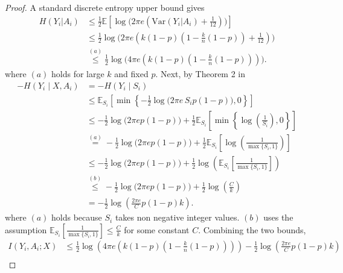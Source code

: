 \documentclass{article}
\newcommand{\E}{\mathbb{E}}
\begin{document}
\begin{proof}
A standard discrete entropy upper bound \cite{lmassey_entropy_1988} gives
\begin{align*}
H(Y_i|A_i)&\leq \frac12\E\left[\log\bigl(2\pi e (\text{Var}(Y_i|A_i)+\frac{1}{12})\bigr)\right]\\
&\leq \frac12\log\bigl(2\pi e (k(1-p)(1-\frac{k}{n}(1-p))+\frac{1}{12})\bigr)\\
&\stackrel{(a)}{\leq}\frac12\log\bigl(4\pi e (k(1-p)(1-\frac{k}{n}(1-p)))\bigr).
\end{align*} where $(a)$ holds for large $k$ and fixed $p$.
Next, by Theorem 2 in \cite{jacquet_entropy_1999}
\begin{align*}
-H(Y_i\mid X,A_i)
&=-H(Y_i\mid S_i)\\
&\le\E_{S_i}\!\left[\min\left\{-\frac12\log\!\bigl(2\pi e\,S_i p(1-p)\bigr),0\right\}\right]\\
&\le -\frac12\log\!\bigl(2\pi e p(1-p)\bigr) +\frac12\E_{S_i}\!\left[\min\left\{\log\!\left(\frac{1}{S_i} \right), 0\right\}\right]\\
&\stackrel{(a)}{=} -\frac12\log\!\bigl(2\pi e p(1-p)\bigr) +\frac12\E_{S_i}\!\left[\log\!\left(\frac{1}{\max\{S_i, 1\}} \right)\right]\\
&\leq -\frac12\log\!\bigl(2\pi e p(1-p)\bigr) +\frac12\log\!\left(\E_{S_i}\!\left[\frac{1}{\max\{S_i, 1\}} \right]\right)\\
&\stackrel{(b)}{\leq} -\frac12\log\!\bigl(2\pi e p(1-p)\bigr) +\frac12\log\!\left(\frac{C}{k}\right)\\
&= -\frac12\log\!\left(\frac{2\pi e}{C} p(1-p)k\right). 
\end{align*} where $(a)$ holds because $S_i$ takes non negative integer values. $(b)$ uses the assumption $\E_{S_i}\!\left[\frac{1}{\max\{S_i, 1\}} \right]\leq \frac{C}{k}$ for some constant $C$.
Combining the two bounds,
\begin{align*}
I(Y_i,A_i;X)
&\leq \frac12\log\left(4\pi e \left(k(1-p)\left(1-\frac{k}{n}(1-p)\right)\right)\right)-\frac12\log\!\left(\frac{2\pi e}{C} p(1-p)k\right)\\

\end{align*}
\end{proof}
\end{document}
